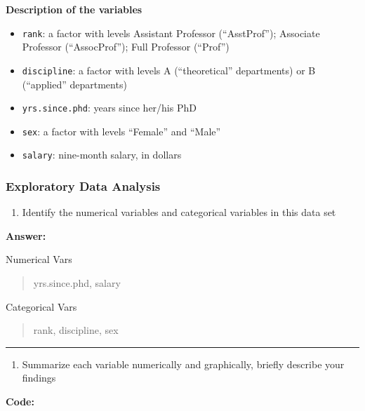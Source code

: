 \documentclass[
]{article}
\providecommand{\tightlist}{%
  \setlength{\itemsep}{0pt}\setlength{\parskip}{0pt}}
\begin{document}
\textbf{Description of the variables}

\begin{itemize}
\item
  \texttt{rank}: a factor with levels Assistant Professor
  (``AsstProf''); Associate Professor (``AssocProf''); Full Professor
  (``Prof'')
\item
  \texttt{discipline}: a factor with levels A (``theoretical''
  departments) or B (``applied'' departments)
\item
  \texttt{yrs.since.phd}: years since her/his PhD
\item
  \texttt{sex}: a factor with levels ``Female'' and ``Male''
\item
  \texttt{salary}: nine-month salary, in dollars
\end{itemize}

\subsubsection{Exploratory Data
Analysis}\label{exploratory-data-analysis}

\begin{enumerate}
\def\labelenumi{\arabic{enumi}.}
\tightlist
\item
  Identify the numerical variables and categorical variables in this
  data set
\end{enumerate}

\textbf{Answer:}

Numerical Vars

\begin{quote}
yrs.since.phd, salary
\end{quote}

Categorical Vars

\begin{quote}
rank, discipline, sex
\end{quote}

\begin{center}\rule{0.5\linewidth}{0.5pt}\end{center}

\begin{enumerate}
\def\labelenumi{\arabic{enumi}.}
\setcounter{enumi}{1}
\tightlist
\item
  Summarize each variable numerically and graphically, briefly describe
  your findings
\end{enumerate}

\textbf{Code:}
\end{document}
